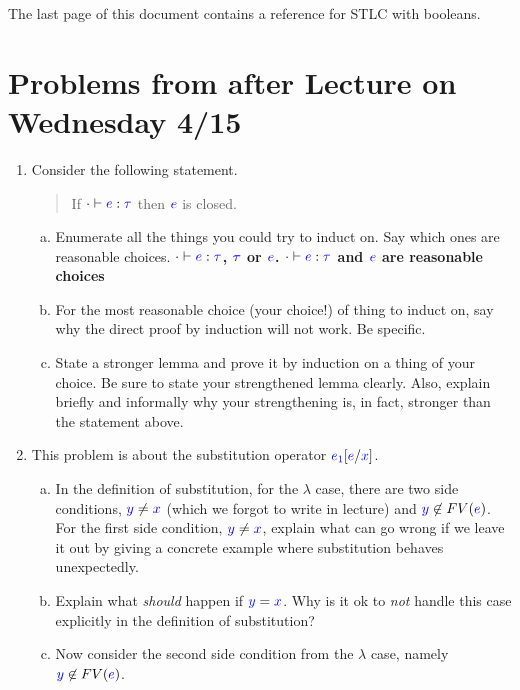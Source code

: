 \documentclass{article}
\newcommand{\meta}[1]{{\color{blue}#1}}
\newcommand{\stlc}{\textsc{STLC}}
\begin{document}
\noindent The last page of this document contains a reference for \stlc{} with booleans.

\section*{Problems from after Lecture on Wednesday 4/15}

\begin{enumerate}[leftmargin=*,itemindent=*,start=1,label={{\bf Problem \arabic*}.},ref=\arabic*]
\item Consider the following statement.
  \begin{quote}
    If $\cdot\vdash\meta{e}:\meta{\tau}$ then $\meta{e}$ is closed.
  \end{quote}
  \begin{enumerate}[(a)]
  \item Enumerate all the things you could try to induct on. Say which ones are reasonable choices. 
    \textbf{$\cdot\vdash\meta{e}:\meta{\tau}$, $\meta{\tau}$ or $\meta{e}$. $\cdot\vdash\meta{e}:\meta{\tau}$ and $\meta{e}$ are reasonable choices}
  \item For the most reasonable choice (your choice!) of thing to induct on, say
    why the direct proof by induction will not work. Be specific.
  \item State a stronger lemma and prove it by induction on a thing of your
    choice. Be sure to state your strengthened lemma clearly. Also, explain
    briefly and informally why your strengthening is, in fact, stronger than the
    statement above.
  \end{enumerate}
\item This problem is about the substitution operator $\meta{e_1}[\meta{e}/\meta{x}]$.
  \begin{enumerate}[(a)]
  \item In the definition of substitution, for the $\lambda$ case, there are two
    side conditions, $\meta{y}\ne\meta{x}$ (which we forgot to write in lecture)
    and $\meta{y}\not\in FV(\meta{e})$. For the first side condition, $\meta{y}\ne\meta{x}$,
    explain what can go wrong if we leave it out by giving a concrete example where
    substitution behaves unexpectedly.
  \item Explain what \emph{should} happen if $\meta{y} = \meta{x}$. Why is it ok to \emph{not} handle this case explicitly in the definition of substitution?
  \item Now consider the second side condition from the $\lambda$ case, namely $\meta{y}\not\in FV(\meta{e})$.

\end{enumerate}
\end{enumerate}
\end{document}
